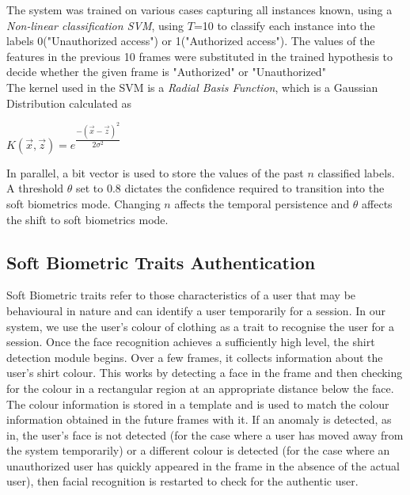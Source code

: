 \documentclass[12pt]{article}			%
\begin{document}
The system was trained on various cases capturing all instances known, using a \emph{Non-linear classification SVM}, using $T$=10 to classify each instance into the labels 0("Unauthorized access") or 1("Authorized access").
The values of the features in the previous 10 frames were substituted in the trained hypothesis to decide whether the given frame is "Authorized" or "Unauthorized"\\
The kernel used in the SVM is a \emph{Radial Basis Function}, which is a Gaussian Distribution calculated as
\begin{center}
$K(\overrightarrow{x}, \overrightarrow{z}) = e^{\dfrac{-(\overrightarrow{x} - \overrightarrow{z})^2}{2\sigma^{2}}}$
\end{center}
In parallel, a bit vector is used to store the values of the past $n$ classified labels. A threshold $\theta$ set to 0.8 dictates the confidence required to transition into the soft biometrics mode. Changing $n$ affects the temporal persistence and $\theta$ affects the shift to soft biometrics mode.
   
\subsection{Soft Biometric Traits Authentication}
Soft Biometric traits refer to those characteristics of a user that may be behavioural in nature and can identify a user temporarily for a session. In our system, we use the user's colour of clothing as a trait to recognise the user for a session. Once the face recognition achieves a sufficiently high level, the shirt detection module begins. Over a few frames, it collects information about the user's shirt colour. This works by detecting a face in the frame and then checking for the colour in a rectangular region at an appropriate distance below the face. The colour information is stored in a template and is used to match the colour information obtained in the future frames with it. If an anomaly is detected, as in, the user's face is not detected (for the case where a user has moved away from the system temporarily) or a different colour is detected (for the case where an unauthorized user has quickly appeared in the frame in the absence of the actual user), then facial recognition is restarted to check for the authentic user.
\end{document}
